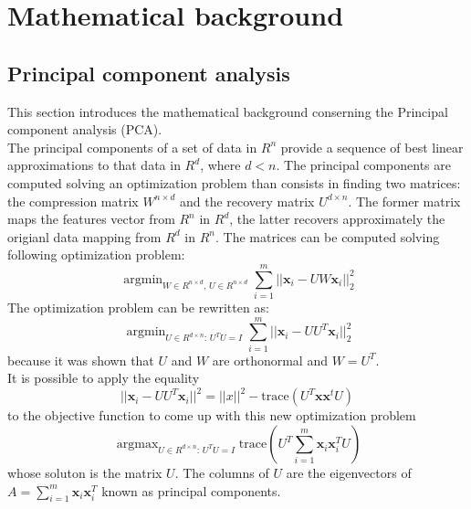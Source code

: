 \documentclass{article}
\DeclareMathOperator*{\argmax}{argmax}
\DeclareMathOperator*{\argmin}{argmin}
\begin{document}
\section{Mathematical background}
\subsection{Principal component analysis}
This section introduces the mathematical background conserning the Principal component analysis (PCA).\\
The principal components of a set of data in $R^n$ provide a sequence of best linear approximations to that data in $R^d$, where $d < n$.
The principal components are computed solving an optimization problem than consists in finding two matrices: the compression matrix $W^{n \times d}$ and  the recovery matrix $U^{d \times n}$. The former matrix maps the features vector from $R^n$ in $R^d$, the latter recovers approximately the origianl data mapping from $R^d$ in $R^n$.
The matrices can be computed solving following optimization problem:
\begin{equation}
\argmin_{W \in R^{n \times d}  , \, U \in R^{n \times d}} \sum_{i = 1}^m ||\textbf{x}_i -UW \textbf{x}_i ||_2^2
\end{equation}
The optimization problem can be rewritten as:
\begin{equation}
\argmin_{U \in R^{d \times n}: \, U^TU=I} \sum_{i = 1}^m ||\textbf{x}_i -UU^T \textbf{x}_i ||_2^2
\end{equation}
because it was shown that $U$ and $W$ are orthonormal and $W = U^T$. \\
It is possible to apply the equality
\begin{equation}
||\textbf{x}_i -UU^T \textbf{x}_i ||^2 = ||x||^2 - \text{trace}(U^T\textbf{x}\textbf{x}^tU)
\end{equation}
to the objective function to come up with this new optimization problem
\begin{equation}
\argmax_{U \in R^{d \times n}: \, U^TU=I} \text{trace} (U^T\sum_{i=1}^m\textbf{x}_i\textbf{x}_i^T U)
\end{equation}
whose soluton is the matrix $U$. The columns of $U$ are the eigenvectors of $A = \sum_{i=1}^m\textbf{x}_i\textbf{x}_i^T$ known as principal components. \cite{book1} \cite{book2}
\end{document}
